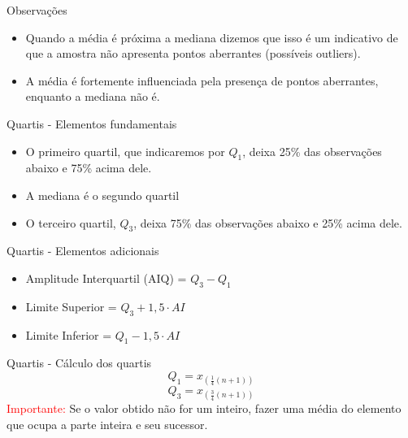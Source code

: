 \begin{frame}{Observações}
\begin{itemize}
    \item Quando a média é próxima a mediana dizemos que isso é um indicativo de que a amostra não apresenta pontos aberrantes (possíveis outliers).
    \item A média é fortemente influenciada pela presença de pontos aberrantes, enquanto a mediana não é.
\end{itemize}
    
\end{frame}



\begin{frame}{Quartis - Elementos fundamentais}
    \begin{itemize}
        \item O primeiro quartil, que indicaremos por $Q_1$, deixa 25\% das observações abaixo e 75\% acima dele. 
        \pause
        \item A mediana é o segundo quartil
        \pause
        \item O terceiro quartil, $Q_3$, deixa 75\% das observações abaixo e 25\% acima dele. 
    \end{itemize}
    
\end{frame}

\begin{frame}{Quartis - Elementos adicionais}
    \begin{itemize}
        \item Amplitude Interquartil (AIQ) = $Q_3 - Q_1$
        \pause
        \item Limite Superior = $Q_3 + 1,5 \cdot AI$
        \pause
        \item Limite Inferior = $Q_1 - 1,5 \cdot AI$
    \end{itemize}
   
\end{frame}

\begin{frame}{Quartis - Cálculo dos quartis}
    $$Q_1 = x_{\left(\frac{1}{4}(n+1) \right)}$$
    \pause
    $$Q_3 =  x_{\left(\frac{3}{4}(n+1)\right)} $$
    \textcolor{red}{Importante:} Se o valor obtido não for um inteiro, fazer uma média do elemento que ocupa a parte inteira e seu sucessor.
\end{frame}

